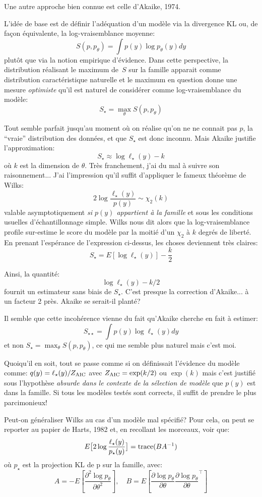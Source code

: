 \documentclass{article}
\begin{document}
Une autre approche bien connue est celle d'Akaike, 1974.

L'id\'ee de base est de d\'efinir l'ad\'equation d'un mod\`ele via la divergence KL ou, de fa\c{c}on \'equivalente, la log-vraisemblance moyenne: 
$$S(p, p_\theta) = \int p(y) \log p_\theta(y) dy$$ 
plut\^ot que via la notion empirique d'\'evidence. Dans cette perspective, la distribution r\'ealisant le maximum de~$S$ sur la famille apparait comme distribution caract\'eristique naturelle et le maximum en question donne une mesure {\em optimiste} qu'il est naturel de consid\'erer comme log-vraisemblance du mod\`ele: 
$$S_\star = \max_\theta S(p, p_\theta)$$ 

Tout semble parfait jusqu'au moment o\`u on r\'ealise qu'on ne ne connait pas $p$, la ``vraie'' distribution des donn\'ees, et que $S_\star$ est donc inconnu. Mais Akaike justifie l'approximation: 
$$S_\star \approx \log \ell_\star(y) - k$$ 
o\`u $k$ est la dimension de $\theta$. Tr\`es franchement, j'ai du mal \`a suivre son raisonnement... 
J'ai l'impression qu'il suffit d'appliquer le fameux th\'eor\`eme de Wilks: 
$$2 \log \frac{\ell_\star(y)}{p(y)} \sim \chi_2(k)$$ 
valable asymptotiquement {\em si $p(y)$ appartient \`a la famille} et sous les conditions usuelles d'\'echantillonnage simple. Wilks nous dit alors que la log-vraisemblance profile sur-estime le score du mod\`ele par la moiti\'e d'un $\chi_2$ \`a $k$ degr\'es de libert\'e. En prenant l'esp\'erance de l'expression ci-dessus, les choses deviennent tr\`es claires: 
$$S_\star = E[\log \ell_\star(y)] - \frac{k}{2}$$ 

Ainsi, la quantit\'e: 
$$\log \ell_\star(y) - k/2$$ 
fournit un estimateur sans biais de $S_\star$. C'est presque la correction d'Akaike... \`a un facteur 2 pr\`es. Akaike se serait-il plant\'e? 

Il semble que cette incoh\'erence vienne du fait qu'Akaike cherche en fait \`a estimer: 
$$S_{\star\star} = \int p(y) \log \ell_\star(y) dy$$ 
et non $S_\star = \max_\theta S(p, p_\theta)$, ce qui me semble plus naturel mais c'est moi. 

Quoiqu'il en soit, tout se passe comme si on d\'efinissait l'\'evidence du mod\`ele comme: $q(y) = \ell_\star(y)/Z_{\rm AIC}$ avec $Z_{\rm AIC} = \exp(k/2)$ ou $\exp(k)$ mais c'est justifi\'e sous l'hypoth\`ese {\em absurde dans le contexte de la s\'election de mod\`ele} que $p(y)$ est dans la famille. Si tous les mod\`eles test\'es sont corrects, il suffit de prendre le plus parcimonieux! 

Peut-on g\'en\'eraliser Wilks au cas d'un mod\`ele mal sp\'ecifi\'e? Pour cela, on peut se reporter au papier de Harts, 1982 et, en recollant les morceaux, voir que: 
$$
E \big[2 \log \frac{\ell_\star(y)}{p_\star(y)} \big] = {\rm trace}(B A^{-1})
$$ 
o\`u $p_\star$ est la projection KL de p sur la famille, avec:
$$
A = -E\left[ \frac{\partial^2 \log p_\theta}{\partial\theta^2} \right],
\quad 
B = E\left[ \frac{\partial \log p_\theta}{\partial\theta} \frac{\partial \log p_\theta}{\partial\theta}^\top \right]
$$ 
\end{document}
